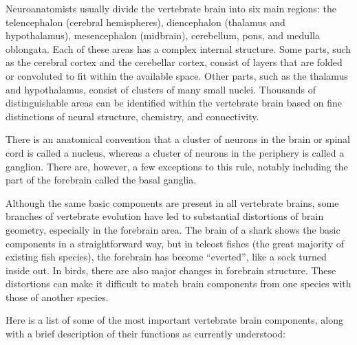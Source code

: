 Neuroanatomists usually divide the vertebrate brain into six main regions: the telencephalon (cerebral hemispheres), diencephalon (thalamus and hypothalamus), mesencephalon (midbrain), cerebellum, pons, and medulla oblongata. Each of these areas has a complex internal structure. Some parts, such as the cerebral cortex and the cerebellar cortex, consist of layers that are folded or convoluted to fit within the available space. Other parts, such as the thalamus and hypothalamus, consist of clusters of many small nuclei. Thousands of distinguishable areas can be identified within the vertebrate brain based on fine distinctions of neural structure, chemistry, and connectivity.

There is an anatomical convention that a cluster of neurons in the brain or spinal cord is called a nucleus, whereas a cluster of neurons in the periphery is called a ganglion. There are, however, a few exceptions to this rule, notably including the part of the forebrain called the basal ganglia.

Although the same basic components are present in all vertebrate brains, some branches of vertebrate evolution have led to substantial distortions of brain geometry, especially in the forebrain area. The brain of a shark shows the basic components in a straightforward way, but in teleost fishes (the great majority of existing fish species), the forebrain has become ``everted'', like a sock turned inside out. In birds, there are also major changes in forebrain structure. These distortions can make it difficult to match brain components from one species with those of another species.

Here is a list of some of the most important vertebrate brain components, along with a brief description of their functions as currently understood:

